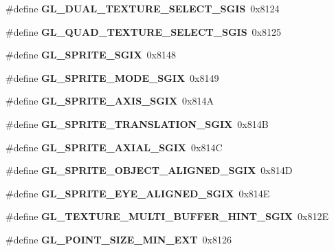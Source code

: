 \begin{DoxyCompactItemize}
\item 
\#define {\bfseries G\+L\+\_\+\+D\+U\+A\+L\+\_\+\+T\+E\+X\+T\+U\+R\+E\+\_\+\+S\+E\+L\+E\+C\+T\+\_\+\+S\+G\+I\+S}~0x8124\label{_s_d_l__opengl_8h_a6efd24f7e7a46e5777b68ff04e9a3ce9}

\item 
\#define {\bfseries G\+L\+\_\+\+Q\+U\+A\+D\+\_\+\+T\+E\+X\+T\+U\+R\+E\+\_\+\+S\+E\+L\+E\+C\+T\+\_\+\+S\+G\+I\+S}~0x8125\label{_s_d_l__opengl_8h_a1a1717df306ef395af2e0af72ee47f7a}

\item 
\#define {\bfseries G\+L\+\_\+\+S\+P\+R\+I\+T\+E\+\_\+\+S\+G\+I\+X}~0x8148\label{_s_d_l__opengl_8h_a2ee32c43bc3545278fd39b8701e75ed3}

\item 
\#define {\bfseries G\+L\+\_\+\+S\+P\+R\+I\+T\+E\+\_\+\+M\+O\+D\+E\+\_\+\+S\+G\+I\+X}~0x8149\label{_s_d_l__opengl_8h_a867e6fc6f926be668d419a84d6d24fb9}

\item 
\#define {\bfseries G\+L\+\_\+\+S\+P\+R\+I\+T\+E\+\_\+\+A\+X\+I\+S\+\_\+\+S\+G\+I\+X}~0x814\+A\label{_s_d_l__opengl_8h_ab69bfff9b80e01c51ebd185c2fafbc92}

\item 
\#define {\bfseries G\+L\+\_\+\+S\+P\+R\+I\+T\+E\+\_\+\+T\+R\+A\+N\+S\+L\+A\+T\+I\+O\+N\+\_\+\+S\+G\+I\+X}~0x814\+B\label{_s_d_l__opengl_8h_a568869f3e8340d5c606427e557a8ce29}

\item 
\#define {\bfseries G\+L\+\_\+\+S\+P\+R\+I\+T\+E\+\_\+\+A\+X\+I\+A\+L\+\_\+\+S\+G\+I\+X}~0x814\+C\label{_s_d_l__opengl_8h_a6201f2cb3f11bb75887d4478b1d80aa4}

\item 
\#define {\bfseries G\+L\+\_\+\+S\+P\+R\+I\+T\+E\+\_\+\+O\+B\+J\+E\+C\+T\+\_\+\+A\+L\+I\+G\+N\+E\+D\+\_\+\+S\+G\+I\+X}~0x814\+D\label{_s_d_l__opengl_8h_af75b54c2a204558bf7b71c9af5589c45}

\item 
\#define {\bfseries G\+L\+\_\+\+S\+P\+R\+I\+T\+E\+\_\+\+E\+Y\+E\+\_\+\+A\+L\+I\+G\+N\+E\+D\+\_\+\+S\+G\+I\+X}~0x814\+E\label{_s_d_l__opengl_8h_a7ea4e65caf90481efafc305159f0f185}

\item 
\#define {\bfseries G\+L\+\_\+\+T\+E\+X\+T\+U\+R\+E\+\_\+\+M\+U\+L\+T\+I\+\_\+\+B\+U\+F\+F\+E\+R\+\_\+\+H\+I\+N\+T\+\_\+\+S\+G\+I\+X}~0x812\+E\label{_s_d_l__opengl_8h_a82d6df544287d02d9d12561c7916f7c1}

\item 
\#define {\bfseries G\+L\+\_\+\+P\+O\+I\+N\+T\+\_\+\+S\+I\+Z\+E\+\_\+\+M\+I\+N\+\_\+\+E\+X\+T}~0x8126\label{_s_d_l__opengl_8h_afe264fc08310763751800ab65fa8b369}


\end{DoxyCompactItemize}
